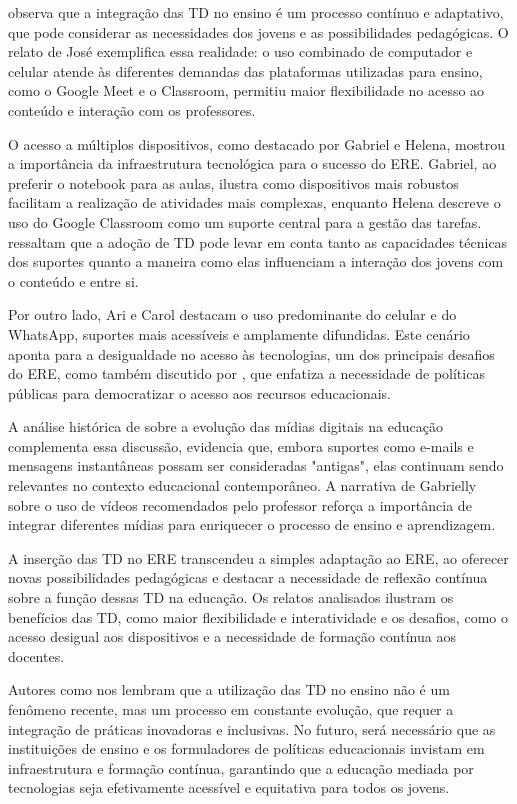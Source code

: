 \documentclass[portuguese]{textolivre}
\begin{document}
\textcite{ribeiro2016} observa que a integração das TD no ensino é um processo contínuo e adaptativo, que pode considerar as necessidades dos jovens e as possibilidades pedagógicas. O relato de José exemplifica essa realidade: o uso combinado de computador e celular atende às diferentes demandas das plataformas utilizadas para ensino, como o Google Meet e o Classroom, permitiu maior flexibilidade no acesso ao conteúdo e interação com os professores.

O acesso a múltiplos dispositivos, como destacado por Gabriel e Helena, mostrou a importância da infraestrutura tecnológica para o sucesso do ERE. Gabriel, ao preferir o notebook para as aulas, ilustra como dispositivos mais robustos facilitam a realização de atividades mais complexas, enquanto Helena descreve o uso do Google Classroom como um suporte central para a gestão das tarefas. \textcite{barton2015} ressaltam que a adoção de TD pode levar em conta tanto as capacidades técnicas dos suportes quanto a maneira como elas influenciam a interação dos jovens com o conteúdo e entre si.

Por outro lado, Ari e Carol destacam o uso predominante do celular e do WhatsApp, suportes mais acessíveis e amplamente difundidas. Este cenário aponta para a desigualdade no acesso às tecnologias, um dos principais desafios do ERE, como também discutido por \textcite{soares2002}, que enfatiza a necessidade de políticas públicas para democratizar o acesso aos recursos educacionais.

A análise histórica de \textcite{barton2015} sobre a evolução das mídias digitais na educação complementa essa discussão, evidencia que, embora suportes como e-mails e mensagens instantâneas possam ser consideradas "antigas", elas continuam sendo relevantes no contexto educacional contemporâneo. A narrativa de Gabrielly sobre o uso de vídeos recomendados pelo professor reforça a importância de integrar diferentes mídias para enriquecer o processo de ensino e aprendizagem.

A inserção das TD no ERE transcendeu a simples adaptação ao ERE, ao oferecer novas possibilidades pedagógicas e destacar a necessidade de reflexão contínua sobre a função dessas TD na educação. Os relatos analisados ilustram os benefícios das TD, como maior flexibilidade e interatividade e os desafios, como o acesso desigual aos dispositivos e a necessidade de formação contínua aos docentes.

Autores como \textcite{ribeiro2016,barton2015,soares2002} nos lembram que a utilização das TD no ensino não é um fenômeno recente, mas um processo em constante evolução, que requer a integração de práticas inovadoras e inclusivas. No futuro, será necessário que as instituições de ensino e os formuladores de políticas educacionais invistam em infraestrutura e formação contínua, garantindo que a educação mediada por tecnologias seja efetivamente acessível e equitativa para todos os jovens.
\end{document}
